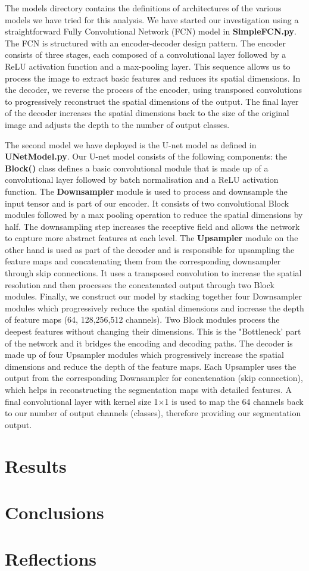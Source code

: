 \documentclass[a4paper,11pt]{article}
\begin{document}
The models directory contains the definitions of architectures of the various models we have tried for this analysis. We have started our investigation using a straightforward Fully Convolutional Network (FCN) model in \textbf{SimpleFCN.py}. The FCN is structured with an encoder-decoder design pattern. The encoder consists of three stages, each composed of a convolutional layer followed by a ReLU activation function and a max-pooling layer. This sequence allows us to process the image to extract basic features and reduces its spatial dimensions. In the decoder, we reverse the process of the encoder, using transposed convolutions to progressively reconstruct the spatial dimensions of the output. The final layer of the decoder increases the spatial dimensions back to the size of the original image and adjusts the depth to the number of output classes. 

The second model we have deployed is the U-net model as defined in \textbf{UNetModel.py}. Our U-net model consists of the following components: the \textbf{Block()} class defines a basic convolutional module that is made up of a convolutional layer followed by batch normalisation and a ReLU activation function. The \textbf{Downsampler} module is used to process and downsample the input tensor and is part of our encoder. It consists of two convolutional Block modules followed by a max pooling operation to reduce the spatial dimensions by half. The downsampling step increases the receptive field and allows the network to capture more abstract features at each level. The \textbf{Upsampler} module on the other hand is used as part of the decoder and is responsible for upsampling the feature maps and concatenating them from the corresponding downsampler through skip connections. It uses a transposed convolution to increase the spatial resolution and then processes the concatenated output through two Block modules. Finally, we construct our model by stacking together four Downsampler modules which progressively reduce the spatial dimensions and increase the depth of feature maps (64, 128,256,512 channels). Two Block modules process the deepest features without changing their dimensions. This is the "Bottleneck' part of the network and it bridges the encoding and decoding paths. The decoder is made up of four Upsampler modules which progressively increase the spatial dimensions and reduce the depth of the feature maps. Each Upsampler uses the output from the corresponding Downsampler for concatenation (skip connection), which helps in reconstructing the segmentation maps with detailed features. A final convolutional layer with kernel size 1$\times$1 is used to map the 64 channels back to our number of output channels (classes), therefore providing our segmentation output. 

\section{Results}

\section{Conclusions}

\section{Reflections}


\end{document}
